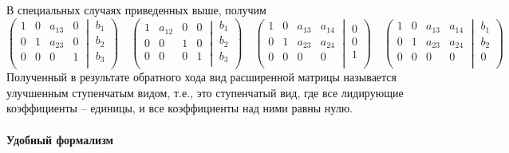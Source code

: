 В специальных случаях приведенных выше, получим
\[
\left(\left.
\begin{matrix}
1& 0&a_{13}& 0\\
0& 1&a_{23}& 0\\
0& 0&0&1\\
\end{matrix}
\:\right|\:
\begin{matrix}
b_1\\
b_2\\
b_3\\
\end{matrix}
\right)
\quad
\left(\left.
\begin{matrix}
1& a_{12}&0& 0\\
0& 0&1& 0\\
0& 0&0&1\\
\end{matrix}
\:\right|\:
\begin{matrix}
b_1\\
b_2\\
b_3\\
\end{matrix}
\right)
\quad
\left(\left.
\begin{matrix}
1& 0&a_{13}& a_{14}\\
0&1&a_{23}& a_{24}\\
0& 0&0& 0\\
\end{matrix}
\:\right|\:
\begin{matrix}
0\\
0\\
1\\
\end{matrix}
\right)
\quad
\left(\left.
\begin{matrix}
1&0&a_{13}& a_{14}\\
0& 1&a_{23}& a_{24}\\
0& 0&0& 0\\
\end{matrix}
\:\right|\:
\begin{matrix}
b_1\\
b_2\\
0\\
\end{matrix}
\right)
\]
Полученный в результате обратного хода вид расширенной матрицы называется улучшенным ступенчатым видом, т.е., это ступенчатый вид, где все лидирующие коэффициенты -- единицы, и все коэффициенты над ними равны нулю.

\paragraph{Удобный формализм}

